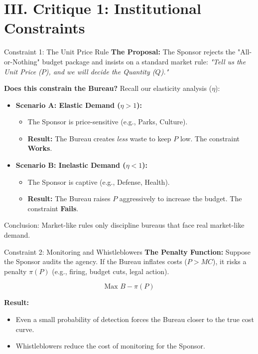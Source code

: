 \documentclass[10pt]{beamer}
\begin{document}
\section{III. Critique 1: Institutional Constraints}

\begin{frame}{Constraint 1: The Unit Price Rule}
\textbf{The Proposal:}
The Sponsor rejects the "All-or-Nothing" budget package and insists on a standard market rule:
\textit{"Tell us the Unit Price ($P$), and we will decide the Quantity ($Q$)."}

\vspace{0.3cm}

\textbf{Does this constrain the Bureau?}
Recall our elasticity analysis ($\eta$):

\begin{itemize}
\item \textbf{Scenario A: Elastic Demand ($\eta > 1$):}
\begin{itemize}
\item The Sponsor is price-sensitive (e.g., Parks, Culture).
\item \textbf{Result:} The Bureau creates \emph{less} waste to keep $P$ low. The constraint \textbf{Works}.
\end{itemize}

\item \textbf{Scenario B: Inelastic Demand ($\eta < 1$):}
\begin{itemize}
\item The Sponsor is captive (e.g., Defense, Health).
\item \textbf{Result:} The Bureau raises $P$ aggressively to increase the budget. The constraint \textbf{Fails}.
\end{itemize}
\end{itemize}

\alert{Conclusion:} Market-like rules only discipline bureaus that face real market-like demand.
\end{frame}

\begin{frame}{Constraint 2: Monitoring and Whistleblowers}
\textbf{The Penalty Function:}
Suppose the Sponsor audits the agency. If the Bureau inflates costs ($P > MC$), it risks a penalty $\pi(P)$ (e.g., firing, budget cuts, legal action).

\[ \text{Max } B - \pi(P) \]

\textbf{Result:} 
\begin{itemize}
\item Even a small probability of detection forces the Bureau closer to the true cost curve.
\item Whistleblowers reduce the cost of monitoring for the Sponsor.
\end{itemize}
\end{frame}
\end{document}
